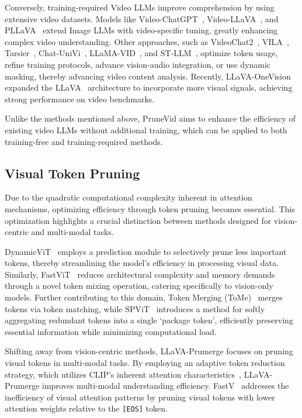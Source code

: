 \documentclass{article} %
\begin{document}
Conversely, training-required Video LLMs improve comprehension by using extensive video datasets. Models like Video-ChatGPT~\citep{videochatgpt}, Video-LLaVA~\citep{videollava}, and PLLaVA~\citep{pllava} extend Image LLMs with video-specific tuning, greatly enhancing complex video understanding. Other approaches, such as VideoChat2~\citep{videochat2}, VILA~\citep{vila}, Tarsier~\cite{tarsier}, Chat-UniVi~\citep{chatunivi}, LLaMA-VID~\citep{llama-vid}, and ST-LLM~\cite{stllm}, optimize token usage, refine training protocols, advance vision-audio integration, or use dynamic masking, thereby advancing video content analysis. Recently, LLaVA-OneVision~\citep{llava-onevision} expanded the LLaVA~\citep{llava} architecture to incorporate more visual signals, achieving strong performance on video benchmarks.

Unlike the methods mentioned above, PruneVid aims to enhance the efficiency of existing video LLMs without additional training, which can be applied to both training-free and training-required methods. 

\subsection{Visual Token Pruning}
Due to the quadratic computational complexity inherent in attention mechanisms, optimizing efficiency through token pruning becomes essential. This optimization highlights a crucial distinction between methods designed for vision-centric and multi-modal tasks.

DynamicViT~\citep{rao2021dynamicvit} employs a prediction module to selectively prune less important tokens, thereby streamlining the model’s efficiency in processing visual data. Similarly, FastViT~\citep{vasu2023fastvit} reduces architectural complexity and memory demands through a novel token mixing operation, catering specifically to vision-only models. Further contributing to this domain, Token Merging (ToMe)~\citep{tokenmerge} merges tokens via token matching, while SPViT~\citep{spvit} introduces a method for softly aggregating redundant tokens into a single ‘package token’, efficiently preserving essential information while minimizing computational load.

Shifting away from vision-centric methods, LLaVA-Prumerge focuses on pruning visual tokens in multi-modal tasks. By employing an adaptive token reduction strategy, which utilizes CLIP’s inherent attention characteristics~\citep{clip}, LLaVA-Prumerge improves multi-modal understanding efficiency. FastV~\cite{fastv} addresses the inefficiency of visual attention patterns by pruning visual tokens with lower attention weights relative to the \texttt{[EOS]} token.
\end{document}
